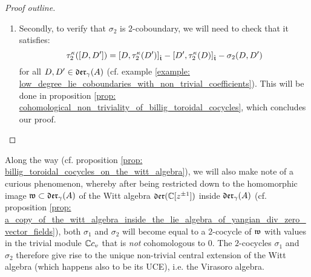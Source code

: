 \begin{proof}[Proof outline]
\begin{enumerate}
\begin{enumerate}
                        \item Secondly, to verify that $\sigma_2$ is $2$-coboundary, we will need to check that it satisfies:
                            $$\tau_2^{\kappa}([D, D']) = [ D, \tau_2^{\kappa}(D') ]_{\hat{\mathfrak{t}}} - [ D', \tau_2^{\kappa}(D) ]_{\hat{\mathfrak{t}}} - \sigma_2(D, D')$$
                        for all $D, D' \in \mathfrak{der}_{\gamma}(A)$ (cf. example \ref{example: low_degree_lie_coboundaries_with_non_trivial_coefficients}). This will be done in proposition \ref{prop: cohomological_non_triviality_of_billig_toroidal_cocycles}, which concludes our proof.
                    \end{enumerate}
                \end{enumerate}
            \end{proof}

        Along the way (cf. proposition \ref{prop: billig_toroidal_cocycles_on_the_witt_algebra}), we will also make note of a curious phenomenon, whereby after being restricted down to the homomorphic image $\mathfrak{w} \subset \mathfrak{der}_{\gamma}(A)$ of the Witt algebra $\mathfrak{der}(\mathbb{C}[z^{\pm 1}])$ inside $\mathfrak{der}_{\gamma}(A)$ (cf. proposition \ref{prop: a_copy_of_the_witt_algebra_inside_the_lie_algebra_of_yangian_div_zero_vector_fields}), both $\sigma_1$ and $\sigma_2$ will become equal to a $2$-cocycle of $\mathfrak{w}$ with values in the trivial module $\mathbb{C} c_v$ that is \textit{not} cohomologous to $0$. The $2$-cocycles $\sigma_1$ and $\sigma_2$ therefore give rise to the unique non-trivial central extension of the Witt algebra (which happens also to be its UCE), i.e. the Virasoro algebra.
    
